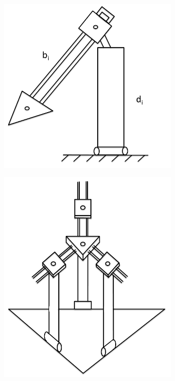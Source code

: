 \documentclass[titlepage, letterpaper]{article}
\begin{document}
\begin{figure}[htbp]
\centering
\begin{subfigure}[b]{0.45\textwidth}
\includegraphics[width=1\linewidth]{static01}
\end{subfigure}
\begin{subfigure}[b]{0.45\textwidth}
\includegraphics[width=1\linewidth]{static02}

\end{subfigure}
\end{figure}
\end{document}

